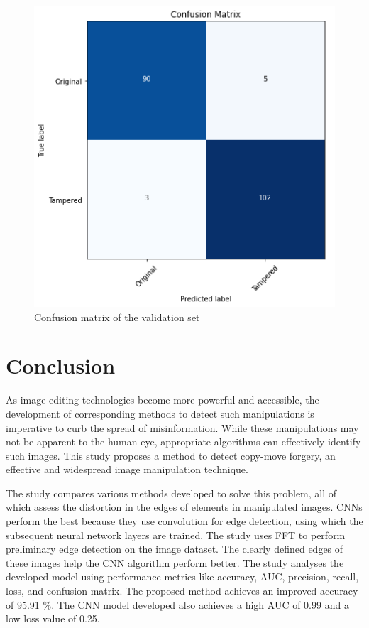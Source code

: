 \documentclass[conference]{IEEEtran}
\begin{document}
\begin{figure}[htpb]
\centerline{\includegraphics[scale=0.43]{confusion.png}}
\caption{Confusion matrix of the validation set}
\label{confusion}
\end{figure}

\section{Conclusion}
As image editing technologies become more powerful and accessible, the development of corresponding methods to detect such manipulations is imperative to curb the spread of misinformation. While these manipulations may not be apparent to the human eye, appropriate algorithms can effectively identify such images. This study proposes a method to detect copy-move forgery, an effective and widespread image manipulation technique. 

The study compares various methods developed to solve this problem, all of which assess the distortion in the edges of elements in manipulated images. CNNs perform the best because they use convolution for edge detection, using which the subsequent neural network layers are trained. The study uses FFT to perform preliminary edge detection on the image dataset. The clearly defined edges of these images help the CNN algorithm perform better. The study analyses the developed model using performance metrics like accuracy, AUC, precision, recall, loss, and confusion matrix. The proposed method achieves an improved accuracy of 95.91 \%. The CNN model developed also achieves a high AUC of 0.99 and a low loss value of 0.25.
\end{document}
